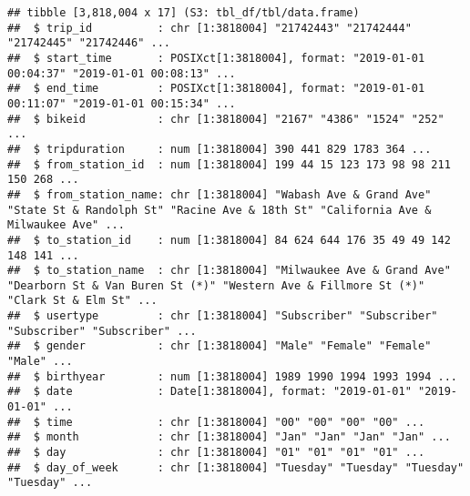 \documentclass[
]{article}
\newenvironment{Shaded}{\begin{snugshade}}{\end{snugshade}}
\newcommand{\FunctionTok}[1]{\textcolor[rgb]{0.00,0.00,0.00}{#1}}
\newcommand{\NormalTok}[1]{#1}
\newcommand{\OtherTok}[1]{\textcolor[rgb]{0.56,0.35,0.01}{#1}}
\newcommand{\SpecialCharTok}[1]{\textcolor[rgb]{0.00,0.00,0.00}{#1}}
\newcommand{\StringTok}[1]{\textcolor[rgb]{0.31,0.60,0.02}{#1}}
\begin{document}
\begin{Shaded}
\end{Shaded}

\begin{verbatim}
## tibble [3,818,004 x 17] (S3: tbl_df/tbl/data.frame)
##  $ trip_id          : chr [1:3818004] "21742443" "21742444" "21742445" "21742446" ...
##  $ start_time       : POSIXct[1:3818004], format: "2019-01-01 00:04:37" "2019-01-01 00:08:13" ...
##  $ end_time         : POSIXct[1:3818004], format: "2019-01-01 00:11:07" "2019-01-01 00:15:34" ...
##  $ bikeid           : chr [1:3818004] "2167" "4386" "1524" "252" ...
##  $ tripduration     : num [1:3818004] 390 441 829 1783 364 ...
##  $ from_station_id  : num [1:3818004] 199 44 15 123 173 98 98 211 150 268 ...
##  $ from_station_name: chr [1:3818004] "Wabash Ave & Grand Ave" "State St & Randolph St" "Racine Ave & 18th St" "California Ave & Milwaukee Ave" ...
##  $ to_station_id    : num [1:3818004] 84 624 644 176 35 49 49 142 148 141 ...
##  $ to_station_name  : chr [1:3818004] "Milwaukee Ave & Grand Ave" "Dearborn St & Van Buren St (*)" "Western Ave & Fillmore St (*)" "Clark St & Elm St" ...
##  $ usertype         : chr [1:3818004] "Subscriber" "Subscriber" "Subscriber" "Subscriber" ...
##  $ gender           : chr [1:3818004] "Male" "Female" "Female" "Male" ...
##  $ birthyear        : num [1:3818004] 1989 1990 1994 1993 1994 ...
##  $ date             : Date[1:3818004], format: "2019-01-01" "2019-01-01" ...
##  $ time             : chr [1:3818004] "00" "00" "00" "00" ...
##  $ month            : chr [1:3818004] "Jan" "Jan" "Jan" "Jan" ...
##  $ day              : chr [1:3818004] "01" "01" "01" "01" ...
##  $ day_of_week      : chr [1:3818004] "Tuesday" "Tuesday" "Tuesday" "Tuesday" ...
\end{verbatim}
\end{document}
